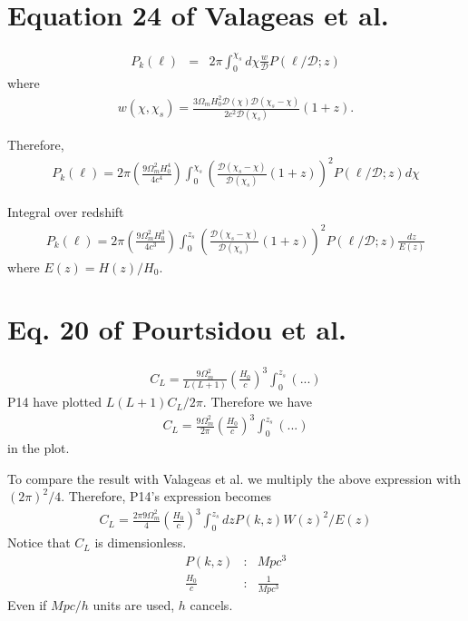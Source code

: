 \documentclass[12pt,a4paper]{article}
\begin{document}
\section{Equation 24 of Valageas et al.}
\begin{eqnarray}
P_k(\ell) &=& 2 \pi \int_0^{\chi_s} d\chi \frac{w}{\mathcal{D}} P (\ell/\mathcal{D}; z)
\end{eqnarray}
where 
\begin{eqnarray}
w(\chi, \chi_s) = \frac{3 \Omega_m H_0^2 \mathcal{D}(\chi) \mathcal{D}(\chi_s - \chi)}{2 c^2 \mathcal{D}(\chi_s)} (1 + z).
\end{eqnarray}

Therefore,
\begin{eqnarray}
P_k(\ell) = 2 \pi \left(\frac{9 \Omega_m^2 H_0^4 }{4 c^4 } \right)
\int_0^{\chi_s}  \left( \frac{ \mathcal{D}(\chi_s - \chi)}{ \mathcal{D}(\chi_s)} (1 + z) \right)^2  P(\ell/\mathcal{D};z) d\chi
\end{eqnarray}

Integral over redshift
\begin{eqnarray}
P_k(\ell) = 2 \pi \left(\frac{9 \Omega_m^2 H_0^3 }{4 c^3 } \right)
\int_0^{z_s}  \left( \frac{ \mathcal{D}(\chi_s - \chi)}{ \mathcal{D}(\chi_s)} (1 + z) \right)^2  P(\ell/\mathcal{D};z) \frac{dz}{E(z)} \label{eq:val}
\end{eqnarray}
where $ E(z)  = H(z)/H_0$.

\section{Eq. 20 of Pourtsidou et al.}
\begin{eqnarray}
C_L = \frac{9\Omega_m^2}{L (L + 1)} \left(\frac{H_0}{c}\right)^3 \int_0^{z_s} (...)
\end{eqnarray}
P14 have plotted $ L (L + 1) C_L /2\pi $. Therefore we have 
\begin{eqnarray}
C_L = \frac{9\Omega_m^2}{2 \pi} \left(\frac{H_0}{c}\right)^3 \int_0^{z_s} (...)
\end{eqnarray}
in the plot.

To compare the result with Valageas et al. we multiply the above expression with $ (2\pi)^2/4 $. Therefore, P14's expression becomes
\begin{eqnarray}
C_L = \frac{2\pi 9\Omega_m^2}{4} \left(\frac{H_0}{c}\right)^3 \int_0^{z_s} dz P(k, z) W(z)^2/E(z) \label{eq:P14}
\end{eqnarray}
Notice that $ C_L  $ is dimensionless.
\begin{eqnarray}
P(k, z)&:& Mpc^3 \\
\frac{H_0}{c}&:& \frac{1}{Mpc^3}
\end{eqnarray}
Even if $ Mpc/h $ units are used, $ h $ cancels. 
\end{document}
